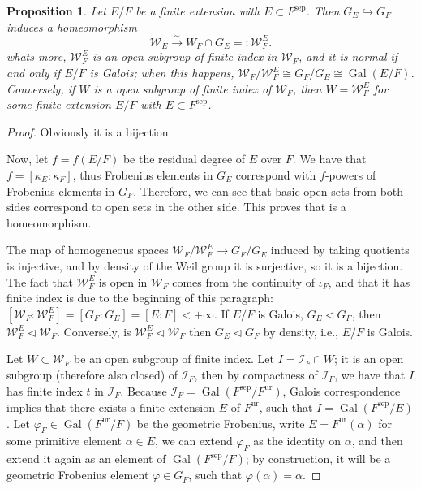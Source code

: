 \documentclass[12pt]{article}
\theoremstyle{plain}
\newtheorem{proposition}[theorem]{Proposition}
\theoremstyle{definition}
\newcommand{\isomlongrightarrow}{\overset{\sim}{\longrightarrow}}
\newcommand{\Gal}[2]{\operatorname{Gal} ( #1 / #2 )}
\newcommand{\sep}[1]{{#1}^{\operatorname{sep}}}
\newcommand{\ur}[1]{{#1}^{\operatorname{ur}}}
\newcommand{\inercia}[1]{\mathcal I_{#1}}
\newcommand{\weil}[1]{\mathcal W_{#1}}
\begin{document}
\begin{proposition}
Let $E/F$ be a finite extension with $E \subset \sep F$. Then $G_E \hookrightarrow G_F$ induces a homeomorphism
\[
    \weil E \isomlongrightarrow W_F \cap G_E =: \weil F^E.
\]
whats more, $\weil F^E$ is an open subgroup of finite index in $\weil F$, and it is normal if and only if $E/F$ is Galois; when this happens, $\weil F / \weil F^E \cong G_F / G_E \cong \Gal E F$. Conversely, if $W$ is a open subgroup of finite index of $\weil F$, then $W = \weil F^E$ for some finite extension $E/F$ with $E \subset \sep F$.
\end{proposition}
\begin{proof}
Obviously it is a bijection.

Now, let $f = f(E/F)$ be the residual degree of $E$ over $F$. We have that $f = [\kappa_E : \kappa_F]$, thus Frobenius elements in $G_E$ correspond with $f$-powers of Frobenius elements in $G_F$. Therefore, we can see that basic open sets from both sides correspond to open sets in the other side. This proves that is a homeomorphism.

The map of homogeneous spaces $\weil F / \weil F^E \to G_F / G_E$ induced by taking quotients is injective, and by density of the Weil group it is surjective, so it is a bijection. The fact that $\weil F^E$ is open in $\weil F$ comes from the continuity of $\iota_F$, and that it has finite index is due to the beginning of this paragraph: $[\weil F : \weil F^E] = [G_F : G_E] = [E : F] < +\infty$. If $E/F$ is Galois, $G_E \triangleleft G_F$, then $\weil F ^E \triangleleft \weil F$. Conversely, is $\weil F^E \triangleleft \weil F$ then $G_E \triangleleft G_F$ by density, i.e., $E/F$ is Galois.

\bigskip

Let $W \subset \weil F$ be an open subgroup of finite index. Let $I = \inercia F \cap W$; it is an open subgroup (therefore also closed) of $\inercia F$, then by compactness of $\inercia F$, we have that $I$ has finite index $t$ in $\inercia F$. Because $\inercia F = \Gal {\sep F} {\ur F}$, Galois correspondence implies that there exists a finite extension $E$ of $\ur F$, such that $I = \Gal {\sep F} {E}$. Let $\varphi_F \in \Gal {\ur F} F$ be the geometric Frobenius, write $E = \ur F (\alpha)$ for some primitive element $\alpha \in E$, we can extend $\varphi_F$ as the identity on $\alpha$, and then extend it again as an element of $\Gal {\sep F} F$; by construction, it will be a geometric Frobenius element $\varphi \in G_F$, such that $\varphi (\alpha) = \alpha$.


\end{proof}
\end{document}
